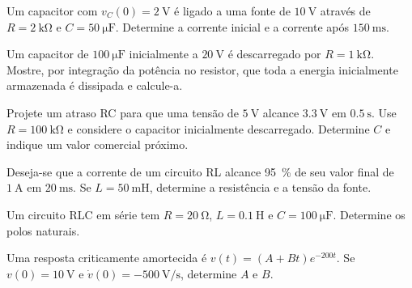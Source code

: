 \begin{questao}[3]{}

Um capacitor com $v_C(0)=\SI{2}{\volt}$ é ligado a uma fonte de
$\SI{10}{\volt}$ através de $R=\SI{2}{\kilo\ohm}$ e
$C=\SI{50}{\micro\farad}$. Determine a corrente inicial e a corrente após
$\SI{150}{\milli\second}$.


\end{questao}
\begin{questao}[3]{}

Um capacitor de $\SI{100}{\micro\farad}$ inicialmente a $\SI{20}{\volt}$ é
descarregado por $R=\SI{1}{\kilo\ohm}$. Mostre, por integração da potência no
resistor, que toda a energia inicialmente armazenada é dissipada e calcule-a.


\end{questao}
\begin{questao}[3]{}

Projete um atraso RC para que uma tensão de $\SI{5}{\volt}$ alcance
$\SI{3.3}{\volt}$ em $\SI{0.5}{\second}$. Use $R=\SI{100}{\kilo\ohm}$ e
considere o capacitor inicialmente descarregado. Determine $C$ e indique um
valor comercial próximo.


\end{questao}
\begin{questao}[3]{}

Deseja-se que a corrente de um circuito RL alcance \SI{95}{\percent} de seu valor
final de $\SI{1}{\ampere}$ em $\SI{20}{\milli\second}$. Se
$L=\SI{50}{\milli\henry}$, determine a resistência e a tensão da fonte.


\end{questao}
\begin{questao}[3]{}

Um circuito RLC em série tem $R=\SI{20}{\ohm}$, $L=\SI{0.1}{\henry}$ e
$C=\SI{100}{\micro\farad}$. Determine os polos naturais.


\end{questao}
\begin{questao}[3]{}

Uma resposta criticamente amortecida é
$v(t)=(A+Bt)e^{-200t}$. Se $v(0)=\SI{10}{\volt}$ e
$\dot v(0)=-\SI{500}{\volt\per\second}$, determine $A$ e $B$.


\end{questao}
